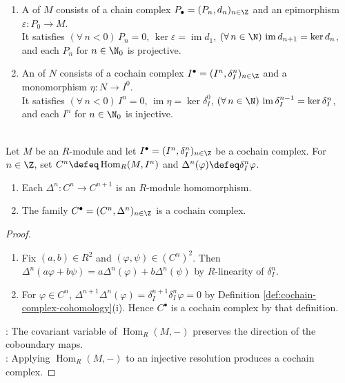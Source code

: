 \begin{definition} \label{def:projective-injective-resolutions} 
\begin{enumerate}[label=(\roman*)]
\setlength{\itemsep}{0pt}
\item A  of $M$ consists of a chain complex $P_\bullet=(P_n,d_n)_{n\in\Z}$ and an epimorphism $\varepsilon:P_0\to M$.\\
It satisfies $(\forall\,n<0)\,P_n=0$, $\ker\varepsilon=\operatorname{im}d_1$, $(\forall\,n\in\N)\,\operatorname{im}d_{n+1}=\ker d_n$, and each $P_n$ for $n\in\N_0$ is projective.
\item An  of $N$ consists of a cochain complex $I^\bullet=(I^n,\delta_I^n)_{n\in\Z}$ and a monomorphism $\eta:N\to I^0$.\\
It satisfies $(\forall\,n<0)\,I^n=0$, $\operatorname{im}\eta=\ker\delta_I^0$, $(\forall\,n\in\N)\,\operatorname{im}\delta_I^{n-1}=\ker\delta_I^n$, and each $I^n$ for $n\in\N_0$ is injective.
\end{enumerate}
\end{definition}

\begin{proposition} \label{prop:hom-cochain-complex} \\
Let $M$ be an $R$-module and let $I^\bullet=(I^n,\delta_I^n)_{n\in\Z}$ be a cochain complex. For $n\in\Z$, set $C^n\defeq\operatorname{Hom}_R(M,I^n)$ and $\Delta^n(\varphi)\defeq\delta_I^n\varphi$.
\begin{enumerate}[label=(\roman*)]
\setlength{\itemsep}{0pt}
\item Each $\Delta^n:C^n\to C^{n+1}$ is an $R$-module homomorphism.
\item The family $C^\bullet=(C^n,\Delta^n)_{n\in\Z}$ is a cochain complex.
\end{enumerate}
\begin{proof}
\begin{enumerate}[label=(\roman*)]
\setlength{\itemsep}{0pt}
\item Fix $(a,b)\in R^2$ and $(\varphi,\psi)\in(C^n)^2$. Then $\Delta^n(a\varphi+b\psi)=a\Delta^n(\varphi)+b\Delta^n(\psi)$ by $R$-linearity of $\delta_I^n$.
\item For $\varphi\in C^n$, $\Delta^{n+1}\Delta^n(\varphi)=\delta_I^{n+1}\delta_I^n\varphi=0$ by Definition \ref{def:cochain-complex-cohomology}(i). Hence $C^\bullet$ is a cochain complex by that definition.
\end{enumerate}
: The covariant variable of $\operatorname{Hom}_R(M,-)$ preserves the direction of the coboundary maps.\\
: Applying $\operatorname{Hom}_R(M,-)$ to an injective resolution produces a cochain complex.
\end{proof}
\end{proposition}

